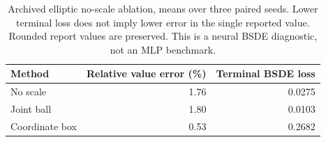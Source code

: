 \begin{table}[htbp]
\centering\small
\caption{Archived elliptic no-scale ablation, means over three paired seeds. Lower terminal loss does not imply lower error in the single reported value. Rounded report values are preserved. This is a neural BSDE diagnostic, not an MLP benchmark.}\label{tab:restored-elliptic}
\begin{tabular}{lrr}
\toprule
Method & Relative value error (\%) & Terminal BSDE loss \\
\midrule
No scale & 1.76 & 0.0275 \\
Joint ball & 1.80 & 0.0103 \\
Coordinate box & 0.53 & 0.2682 \\
\bottomrule
\end{tabular}
\end{table}
